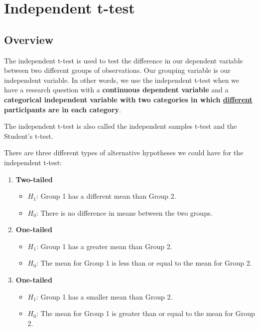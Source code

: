 \documentclass[
]{book}
\providecommand{\tightlist}{%
  \setlength{\itemsep}{0pt}\setlength{\parskip}{0pt}}
\begin{document}
\hypertarget{independent-t-test}{%
\section{Independent t-test}\label{independent-t-test}}

\hypertarget{overview-1}{%
\subsection{Overview}\label{overview-1}}

The independent t-test is used to test the difference in our dependent variable between two different groups of observations. Our grouping variable is our independent variable. In other words, we use the independent t-test when we have a research question with a \textbf{continuous dependent variable} and a \textbf{categorical independent variable with two categories in which \underline{different} participants are in each category}.

The independent t-test is also called the independent samples t-test and the Student's t-test.

There are three different types of alternative hypotheses we could have for the independent t-test:

\begin{enumerate}
\def\labelenumi{\arabic{enumi}.}
\item
  \textbf{Two-tailed}

  \begin{itemize}
  \tightlist
  \item
    \(H_1\): Group 1 has a different mean than Group 2.
  \item
    \(H_0\): There is no difference in means between the two groups.
  \end{itemize}
\item
  \textbf{One-tailed}

  \begin{itemize}
  \tightlist
  \item
    \(H_1\): Group 1 has a greater mean than Group 2.
  \item
    \(H_0\): The mean for Group 1 is less than or equal to the mean for Group 2.
  \end{itemize}
\item
  \textbf{One-tailed}

  \begin{itemize}
  \tightlist
  \item
    \(H_1\): Group 1 has a smaller mean than Group 2.
  \item
    \(H_0\): The mean for Group 1 is greater than or equal to the mean for Group 2.
  \end{itemize}
\end{enumerate}
\end{document}
